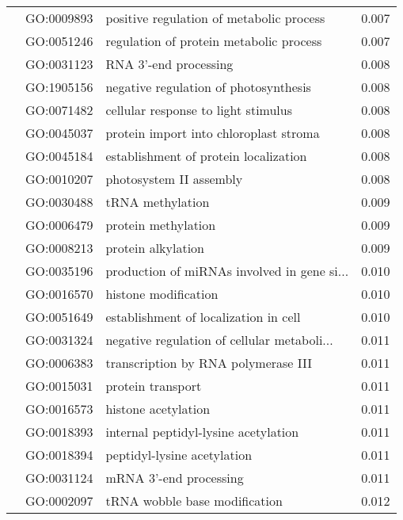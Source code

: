 \begin{longtable}{lllr}
   & GO:0009893 &     positive regulation of metabolic process &         0.007 \\
   & GO:0051246 &      regulation of protein metabolic process &         0.007 \\
   & GO:0031123 &                        RNA 3'-end processing &         0.008 \\
   & GO:1905156 &        negative regulation of photosynthesis &         0.008 \\
   & GO:0071482 &          cellular response to light stimulus &         0.008 \\
   & GO:0045037 &       protein import into chloroplast stroma &         0.008 \\
   & GO:0045184 &        establishment of protein localization &         0.008 \\
   & GO:0010207 &                      photosystem II assembly &         0.008 \\
   & GO:0030488 &                             tRNA methylation &         0.009 \\
   & GO:0006479 &                          protein methylation &         0.009 \\
   & GO:0008213 &                           protein alkylation &         0.009 \\
   & GO:0035196 &  production of miRNAs involved in gene si... &         0.010 \\
   & GO:0016570 &                         histone modification &         0.010 \\
   & GO:0051649 &        establishment of localization in cell &         0.010 \\
   & GO:0031324 &  negative regulation of cellular metaboli... &         0.011 \\
   & GO:0006383 &          transcription by RNA polymerase III &         0.011 \\
   & GO:0015031 &                            protein transport &         0.011 \\
   & GO:0016573 &                          histone acetylation &         0.011 \\
   & GO:0018393 &         internal peptidyl-lysine acetylation &         0.011 \\
   & GO:0018394 &                  peptidyl-lysine acetylation &         0.011 \\
   & GO:0031124 &                       mRNA 3'-end processing &         0.011 \\
   & GO:0002097 &                tRNA wobble base modification &         0.012 \\

\end{longtable}
